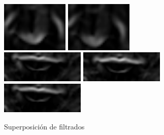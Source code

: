 \begin{figure}[h!]
	\includegraphics[width=3.2cm]{imagenes/M2_superpos_nariz_20deg.png}
	\includegraphics[width=3.2cm]{imagenes/M2_superpos_nariz_10deg.png}\\
	\includegraphics[width=4cm]{imagenes/M2_superpos_boca_45deg.png}
	\includegraphics[width=4cm]{imagenes/M2_superpos_boca_20deg.png}
	\includegraphics[width=4cm]{imagenes/M2_superpos_boca_10deg.png}
	\caption{Superposición de filtrados}
	\label{fig:filter_superp}
\end{figure}


